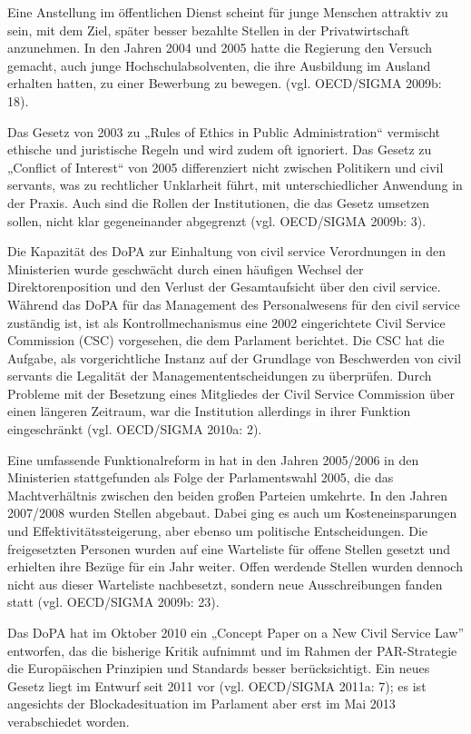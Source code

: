 Eine Anstellung im öffentlichen Dienst scheint für junge Menschen attraktiv zu sein, mit dem Ziel, später besser bezahlte Stellen in der Privatwirtschaft anzunehmen. In den Jahren 2004 und 2005 hatte die Regierung den Versuch gemacht, auch junge Hochschulabsolventen, die ihre Ausbildung im Ausland erhalten hatten, zu einer Bewerbung zu bewegen. (vgl. OECD/SIGMA 2009b: 18).\par
Das Gesetz von 2003 zu „Rules of Ethics in Public Administration“ vermischt ethische und juristische Regeln und wird zudem oft ignoriert. Das Gesetz zu „Conflict of Interest“ von 2005 differenziert nicht zwischen Politikern und civil servants, was zu rechtlicher Unklarheit führt, mit unterschiedlicher Anwendung in der Praxis. Auch sind die Rollen der Institutionen, die das Gesetz umsetzen sollen, nicht klar gegeneinander abgegrenzt (vgl. OECD/SIGMA 2009b: 3). \par
Die Kapazität des DoPA zur Einhaltung von civil service Verordnungen in den Ministerien wurde geschwächt durch einen häufigen Wechsel der Direktorenposition und den Verlust der Gesamtaufsicht über den civil service. Während das DoPA für das Management des Personalwesens für den civil service zuständig ist, ist als Kontrollmechanismus eine 2002 eingerichtete Civil Service Commission (CSC) vorgesehen, die dem Parlament berichtet. Die CSC hat die Aufgabe, als vorgerichtliche Instanz auf der Grundlage von Beschwerden von civil servants die Legalität der Managemententscheidungen zu überprüfen. Durch Probleme mit der Besetzung eines Mitgliedes der Civil Service Commission über einen längeren Zeitraum, war die Institution allerdings in ihrer Funktion eingeschränkt (vgl. OECD/SIGMA 2010a: 2).\par
Eine umfassende Funktionalreform in hat in den Jahren 2005/2006 in den Ministerien stattgefunden als Folge der Parlamentswahl 2005, die das Machtverhältnis zwischen den beiden großen Parteien umkehrte. In den Jahren 2007/2008 wurden Stellen abgebaut. Dabei ging es auch um Kosteneinsparungen und Effektivitätssteigerung, aber ebenso um politische Entscheidungen. Die freigesetzten Personen wurden auf eine Warteliste für offene Stellen gesetzt und erhielten ihre Bezüge für ein Jahr weiter. Offen werdende Stellen wurden dennoch nicht aus dieser Warteliste nachbesetzt, sondern neue Ausschreibungen fanden statt (vgl. OECD/SIGMA 2009b: 23).\par
Das DoPA hat im Oktober 2010 ein „Concept Paper on a New Civil Service Law” entworfen, das die bisherige Kritik aufnimmt und im Rahmen der PAR-Strategie die Europäischen Prinzipien und Standards besser berücksichtigt. Ein neues Gesetz liegt im Entwurf seit 2011 vor (vgl. OECD/SIGMA 2011a: 7); es ist angesichts der Blockadesituation im Parlament aber erst im Mai 2013 verabschiedet worden.\par
